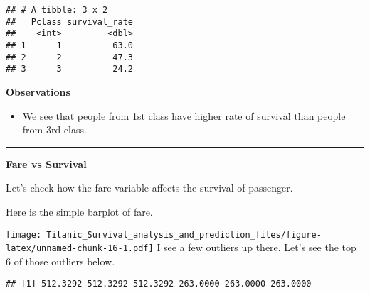 \documentclass[]{article}
\newenvironment{Shaded}{\begin{snugshade}}{\end{snugshade}}
\newcommand{\KeywordTok}[1]{\textcolor[rgb]{0.13,0.29,0.53}{\textbf{#1}}}
\newcommand{\DataTypeTok}[1]{\textcolor[rgb]{0.13,0.29,0.53}{#1}}
\newcommand{\DecValTok}[1]{\textcolor[rgb]{0.00,0.00,0.81}{#1}}
\newcommand{\StringTok}[1]{\textcolor[rgb]{0.31,0.60,0.02}{#1}}
\newcommand{\CommentTok}[1]{\textcolor[rgb]{0.56,0.35,0.01}{\textit{#1}}}
\newcommand{\OperatorTok}[1]{\textcolor[rgb]{0.81,0.36,0.00}{\textbf{#1}}}
\newcommand{\NormalTok}[1]{#1}
\providecommand{\tightlist}{%
  \setlength{\itemsep}{0pt}\setlength{\parskip}{0pt}}
\begin{document}
\begin{verbatim}
## # A tibble: 3 x 2
##   Pclass survival_rate
##    <int>         <dbl>
## 1      1          63.0
## 2      2          47.3
## 3      3          24.2
\end{verbatim}

\textbf{Observations}

\begin{itemize}
\tightlist
\item
  We see that people from 1st class have higher rate of survival than
  people from 3rd class.
\end{itemize}

\begin{center}\rule{0.5\linewidth}{\linethickness}\end{center}

\textbf{Fare vs Survival}

Let's check how the fare variable affects the survival of passenger.

Here is the simple barplot of fare.

\begin{Shaded}
\end{Shaded}

\texttt{[image: Titanic\_Survival\_analysis\_and\_prediction\_files/figure-latex/unnamed-chunk-16-1.pdf]}
I see a few outliers up there. Let's see the top 6 of those outliers
below.

\begin{Shaded}
\end{Shaded}

\begin{verbatim}
## [1] 512.3292 512.3292 512.3292 263.0000 263.0000 263.0000
\end{verbatim}

\begin{Shaded}
\end{Shaded}
\end{document}
